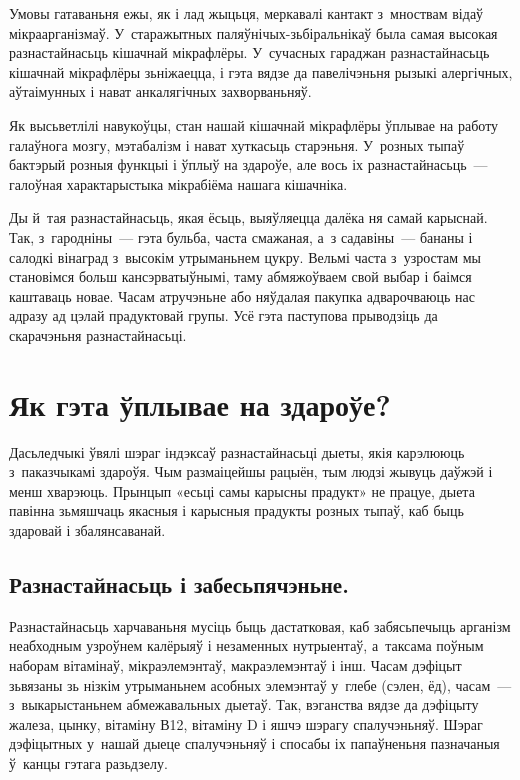 Умовы гатаваньня ежы, як і лад жыцьця, меркавалі кантакт з~мноствам відаў мікраарганізмаў. У~старажытных паляўнічых-зьбіральнікаў была самая высокая разнастайнасьць кішачнай мікрафлёры. У~сучасных гараджан разнастайнасьць кішачнай мікрафлёры зьніжаецца, і гэта вядзе да павелічэньня рызыкі алергічных, аўтаімунных і нават анкалягічных захворваньняў.


Як высьветлілі навукоўцы, стан нашай кішачнай мікрафлёры ўплывае на работу галаўнога мозгу, мэтабалізм і нават хуткасьць старэньня. У~розных тыпаў бактэрый розныя функцыі і ўплыў на здароўе, але вось іх разнастайнасьць~--- галоўная характарыстыка мікрабіёма нашага кішачніка.

Ды й~тая разнастайнасьць, якая ёсьць, выяўляецца далёка ня самай карыснай. Так, з~гародніны~--- гэта бульба, часта смажаная, а~з садавіны~--- бананы і салодкі вінаград з~высокім утрыманьнем цукру. Вельмі часта з~узростам мы становімся больш кансэрватыўнымі, таму абмяжоўваем свой выбар і баімся каштаваць новае. Часам атручэньне або няўдалая пакупка адварочваюць нас адразу ад цэлай прадуктовай групы. Усё гэта паступова прыводзіць да скарачэньня разнастайнасьці.

\section{Як гэта ўплывае на здароўе?}

Дасьледчыкі ўвялі шэраг індэксаў разнастайнасьці дыеты, якія карэлююць з~паказчыкамі здароўя. Чым размаіцейшы рацыён, тым людзі жывуць даўжэй і менш хварэюць. Прынцып «есьці самы карысны прадукт» не працуе, дыета павінна зьмяшчаць якасныя і карысныя прадукты розных тыпаў, каб быць здаровай і збалянсаванай.

\subsection{Разнастайнасьць і забесьпячэньне.}
Разнастайнасьць харчаваньня мусіць быць дастатковая, каб забясьпечыць арганізм неабходным узроўнем калёрыяў і незаменных нутрыентаў, а~таксама поўным наборам вітамінаў, мікраэлемэнтаў, макраэлемэнтаў і інш. Часам дэфіцыт зьвязаны зь нізкім утрыманьнем асобных элемэнтаў у~глебе (сэлен, ёд), часам~--- з~выкарыстаньнем абмежавальных дыетаў. Так, вэганства вядзе да дэфіцыту жалеза, цынку, вітаміну В12, вітаміну D і яшчэ шэрагу спалучэньняў. Шэраг дэфіцытных у~нашай дыеце спалучэньняў і спосабы іх папаўненьня пазначаныя ў~канцы гэтага разьдзелу.


